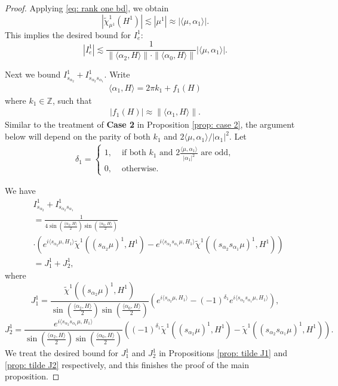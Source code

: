 \documentclass{amsart}
\numberwithin{equation}{section}
\numberwithin{equation}{section}
\begin{document}
\begin{proof}
Applying \eqref{eq: rank one bd}, we obtain 
$$|\widetilde{\chi}^1_{\mu^1}(H^1)|\lesssim |\mu^1|\approx|\langle \mu,\alpha_1\rangle|.$$
This implies the desired bound for $I^1_{e}$:
$$|I^1_{e}|\lesssim \frac{1}{\|\langle\alpha_2,H\rangle\|\cdot \|\langle\alpha_0,H\rangle\|}|\langle\mu,\alpha_1\rangle|.$$

Next we bound $I^1_{s_{\alpha_2}}+I^1_{s_{\alpha_2}s_{\alpha_1}}$. 
Write 
\begin{align}\label{eq: alpha1H}
    \langle\alpha_1, H\rangle=2\pi k_1+f_1(H)
\end{align}
where $k_1\in\mathbb{Z}$, such that 
\begin{align}\label{eq: f1}
    |f_1(H)|\approx \|\langle\alpha_1, H\rangle\|.
\end{align}
Similar to the treatment of \textbf{Case 2} in Proposition \ref{prop: case 2}, the argument below will depend on the parity of both $k_1$ and $2\langle\mu,\alpha_1\rangle/|\alpha_1|^2$. Let 
\begin{align}\label{eq: def delta 1}
\delta_1=\left\{\begin{array}{ll}
    1, & \text{ if both }k_1 \text{ and } 2\frac{\langle\mu,\alpha_1\rangle}{|\alpha_1|^2}\text{ are odd}, \\
    0, & \text{ otherwise}.
\end{array}\right.
\end{align}

We have 
\begin{align}
   &I^1_{s_{\alpha_2}}+I^1_{s_{\alpha_2}s_{\alpha_1}}\nonumber\\
   &=\frac{1}{4 \sin\left(\frac{\langle\alpha_2, H\rangle}{2}\right)\sin\left(\frac{\langle\alpha_0, H\rangle}{2}\right)}\nonumber\\
    &\cdot 
    \left(e^{i\langle s_{\alpha_2}\mu, H_{1}\rangle}\widetilde{\chi}^1({(s_{\alpha_2}\mu)^1}, H^1)-e^{i\langle s_{\alpha_2}s_{\alpha_1}\mu, H_{1}\rangle}\widetilde{\chi}^1({(s_{\alpha_2}s_{\alpha_1}\mu)^1}, H^1)\right)\nonumber\\
    &=J^1_1+J^1_2,\label{eq: cancellation case 3}
    \end{align}
    where 
     $$J^1_1=\frac{\widetilde{\chi}^1({(s_{\alpha_2}\mu)^1}, H^1)}{ \sin\left(\frac{\langle\alpha_2, H\rangle}{2}\right)\sin\left(\frac{\langle\alpha_0, H\rangle}{2}\right)}\left(e^{i\langle s_{\alpha_2}\mu, H_{1}\rangle}-(-1)^{\delta_1} e^{i\langle s_{\alpha_2}s_{\alpha_1}\mu, H_{1}\rangle}\right),$$
    $$J^1_2=\frac{e^{i\langle s_{\alpha_2}s_{\alpha_1}\mu, H_{1}\rangle}}{ \sin\left(\frac{\langle\alpha_2, H\rangle}{2}\right)\sin\left(\frac{\langle\alpha_0, H\rangle}{2}\right)}
    \left((-1)^{\delta_1}\widetilde{\chi}^1({(s_{\alpha_2}\mu)^1}, H^1)-\widetilde{\chi}^1({(s_{\alpha_2}s_{\alpha_1}\mu)^1}, H^1)\right).$$
We treat the desired bound for $J^1_1$ and $J^1_2$ in Propositions \ref{prop: tilde J1} and \ref{prop: tilde J2} respectively, and this finishes the proof of the main proposition.  
\end{proof}
\end{document}
